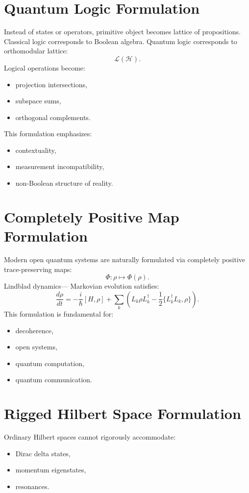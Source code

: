 \section{Quantum Logic Formulation}
\label{qmf:ql}
Instead of states or operators, primitive object becomes lattice of propositions.
Classical logic corresponds to Boolean algebra.
Quantum logic corresponds to orthomodular lattice:
\[\mathcal L(\mathcal H).\]
Logical operations become:
\begin{itemize}
\item projection intersections,
\item subspace sums,
\item orthogonal complements.
\end{itemize}
This formulation emphasizes:
\begin{itemize}
\item contextuality,
\item measurement incompatibility,
\item non-Boolean structure of reality.
\end{itemize}

\section{Completely Positive Map Formulation}
\label{qmf:cpm}
Modern open quantum systems are naturally formulated via completely positive trace-preserving maps:
\[\Phi:\rho\mapsto\Phi(\rho).\]
Lindblad dynamics---
Markovian evolution satisfies:
\[\frac{d\rho}{dt}=
-\frac{i}{\hbar}[H,\rho]
+\sum_k\left(L_k \rho L_k^\dagger
-\frac{1}{2}\{L_k^\dagger L_k,\rho\}\right).\]
This formulation is fundamental for:
\begin{itemize}
\item decoherence,
\item open systems,
\item quantum computation,
\item quantum communication.
\end{itemize}

\section{Rigged Hilbert Space Formulation}
Ordinary Hilbert spaces cannot rigorously accommodate:
\begin{itemize}
\item Dirac delta states,
\item momentum eigenstates,
\item resonances.
\end{itemize}
